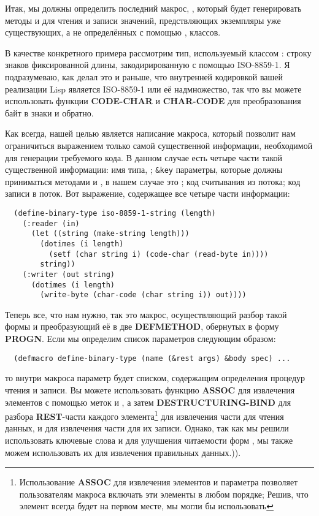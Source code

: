 Итак, мы должны определить последний макрос, , который будет
генерировать методы  и  для чтения и записи значений,
предствляющих экземпляры уже существующих, а не определённых с помощью
, классов.

В качестве конкретного примера рассмотрим тип, используемый классом : строку
знаков фиксированной длины, закодирированную с помощью ISO-8859-1. Я подразумеваю, как
делал это и раньше, что внутренней кодировкой вашей реализации Lisp является ISO-8859-1
или её надмножество, так что вы можете использовать функции \textbf{CODE-CHAR} и
\textbf{CHAR-CODE} для преобразования байт в знаки и обратно.

Как всегда, нашей целью является написание макроса, который позволит нам ограничиться
выражением только самой существенной информации, необходимой для генерации требуемого
кода. В данном случае есть четыре части такой существенной информации: имя типа,
; \lstinline!&key! параметры, которые должны приниматься методами
 и , в нашем случае это ; код считывания
из потока; код записи в поток. Вот выражение, содержащее все четыре части информации:

\begin{lstlisting}
  (define-binary-type iso-8859-1-string (length)
    (:reader (in)
      (let ((string (make-string length)))
        (dotimes (i length)
          (setf (char string i) (code-char (read-byte in))))
        string))
    (:writer (out string)
      (dotimes (i length)
        (write-byte (char-code (char string i)) out))))
\end{lstlisting}

Теперь все, что нам нужно, так это макрос, осуществляющий разбор такой формы и
преобразующий её в две \textbf{DEFMETHOD}, обернутых в форму \textbf{PROGN}. Если мы
определим список параметров  следующим образом:

\begin{lstlisting}
  (defmacro define-binary-type (name (&rest args) &body spec) ...
\end{lstlisting}

то внутри макроса параметр  будет списком, содержащим определения процедур
чтения и записи. Вы можете использовать функцию \textbf{ASSOC} для извлечения элементов
 с помощью меток  и , а затем
\textbf{DESTRUCTURING-BIND} для разбора \textbf{REST}-части каждого
элемента\footnote{Использование \textbf{ASSOC} для извлечения элементов  и
   параметра  позволяет пользователям макроса
   включать эти элементы в любом порядке; Решив, что элемент
   всегда будет на первом месте, мы могли бы использовать } для извлечения части для чтения данных, и  для
извлечения части для их записи. Однако, так как мы решили использовать ключевые слова
 и  для улучшения читаемости форм ,
мы также можем использовать их для извлечения правильных данных.)).

